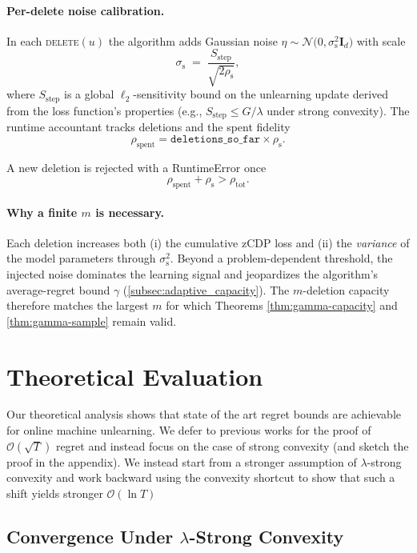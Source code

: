 \documentclass{article}
\theoremstyle{ssltheorem}
\begin{document}
\paragraph{Per-delete noise calibration.}
In each \textsc{delete}$(u)$ the algorithm adds Gaussian noise
$
  \eta\sim\mathcal{N}\bigl(0,\sigma_{\text{s}}^{2}\mathbf I_{d}\bigr)
$
with scale
$$
  \sigma_{\text{s}}
  \;=\;
\frac{S_{\text{step}}}{\sqrt{2\rho_{\text{s}}}},
$$
where $S_{\text{step}}$ is a global $\ell_2$-sensitivity bound on the unlearning update derived from the loss function's properties (e.g., $S_{\text{step}} \le G/\lambda$ under strong convexity). The runtime accountant tracks deletions and the spent fidelity
$$
  \rho_{\text{spent}} = \texttt{deletions\_so\_far}\times\rho_{\text{s}}.
$$

A new deletion is rejected with a RuntimeError once
$$
  \rho_{\text{spent}} + \rho_{\text{s}} > \rho_{\text{tot}}.
$$

\paragraph{Why a finite $m$ is necessary.}
Each deletion increases both (i) the cumulative zCDP loss and
(ii) the \emph{variance} of the model parameters through \(\sigma_{\text{s}}^{2}\).
Beyond a problem-dependent threshold, the injected noise dominates the
learning signal and jeopardizes the algorithm’s average-regret
bound \(\gamma\) (\ref{subsec:adaptive_capacity}).
The $m$-deletion capacity therefore matches the largest $m$ for which
Theorems \ref{thm:gamma-capacity} and \ref{thm:gamma-sample}
remain valid.
\section{Theoretical Evaluation}
\label{sec:theory}

Our theoretical analysis shows that state of the art regret bounds are achievable for online machine unlearning.
We defer to previous works for the proof of $\mathcal{O}(\sqrt{T})$ regret and instead focus on the case of strong convexity (and sketch the proof in the appendix).
We instead start from a stronger assumption of $\lambda$-strong convexity and work backward using the convexity shortcut to show that such a shift yields stronger $\mathcal{O}(\ln T)$

\subsection{Convergence Under $\lambda$-Strong Convexity}
\end{document}
